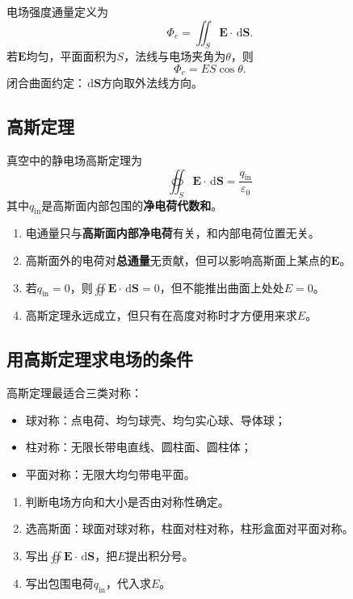 \documentclass[UTF8,zihao=-4]{ctexart}
\newcommand{\dd}{\,\mathrm d}
\newcommand{\epsz}{\varepsilon_0}
\newcommand{\ve}[1]{\bm{#1}}
\newcommand{\E}{\ve E}
\newcommand{\dS}{\dd\ve S}
\begin{document}
电场强度通量定义为
\begin{equation}
\Phi_e=\iint_S \E\cdot\dS.
\end{equation}
若\(\E\)均匀，平面面积为\(S\)，法线与电场夹角为\(\theta\)，则
\begin{equation}
\Phi_e=ES\cos\theta.
\end{equation}
闭合曲面约定：\(\dS\)方向取外法线方向。

\subsection{高斯定理}

真空中的静电场高斯定理为
\begin{equation}
\boxed{\oiint_S \E\cdot\dS=\frac{q_{\mathrm{in}}}{\epsz}}
\end{equation}
其中\(q_{\mathrm{in}}\)是高斯面内部包围的\textbf{净电荷代数和}。

\begin{keybox}[高斯定理的判断题核心]
\begin{enumerate}
  \item 电通量只与\textbf{高斯面内部净电荷}有关，和内部电荷位置无关。
  \item 高斯面外的电荷对\textbf{总通量}无贡献，但可以影响高斯面上某点的\(\E\)。
  \item 若\(q_{\mathrm{in}}=0\)，则\(\oiint \E\cdot\dS=0\)，但不能推出曲面上处处\(E=0\)。
  \item 高斯定理永远成立，但只有在高度对称时才方便用来求\(E\)。
\end{enumerate}
\end{keybox}

\subsection{用高斯定理求电场的条件}

高斯定理最适合三类对称：
\begin{itemize}
  \item 球对称：点电荷、均匀球壳、均匀实心球、导体球；
  \item 柱对称：无限长带电直线、圆柱面、圆柱体；
  \item 平面对称：无限大均匀带电平面。
\end{itemize}

\begin{methodbox}[高斯定理求场强步骤]
\begin{enumerate}
  \item 判断电场方向和大小是否由对称性确定。
  \item 选高斯面：球面对球对称，柱面对柱对称，柱形盒面对平面对称。
  \item 写出\(\oiint \E\cdot\dS\)，把\(E\)提出积分号。
  \item 写出包围电荷\(q_{\mathrm{in}}\)，代入求\(E\)。
\end{enumerate}
\end{methodbox}
\end{document}
